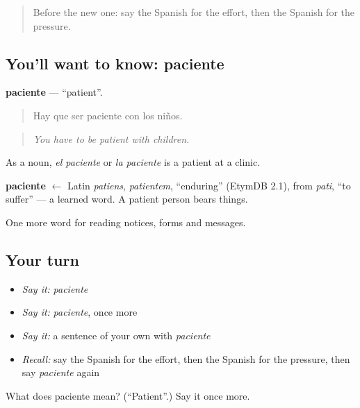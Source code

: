 \label{lesson:ES-C503-paciente}



\begin{quote}
Before the new one: say the Spanish for the effort, then the Spanish for the pressure.
\end{quote}

\subsection*{You'll want to know: paciente}
\textbf{paciente} — \textquotedblleft{}patient\textquotedblright{}.

\begin{quote}
Hay que ser paciente con los niños.
\end{quote}

\begin{quote}
\emph{You have to be patient with children.}
\end{quote}

As a noun, \emph{el paciente} or \emph{la paciente} is a patient at a clinic.

\begin{cousinweb}
\textbf{paciente} $\leftarrow$ Latin \emph{patiens}, \emph{patientem}, \textquotedblleft{}enduring\textquotedblright{} (EtymDB 2.1), from \emph{pati}, \textquotedblleft{}to suffer\textquotedblright{} — a learned word. A patient person bears things.
\end{cousinweb}

\begin{grammarlens}[title={What you've built}]
One more word for reading notices, forms and messages.
\end{grammarlens}

\subsection*{Your turn}
\begin{itemize}
\raggedright
  \item \emph{Say it:} \emph{paciente}
  \item \emph{Say it:} \emph{paciente}, once more
  \item \emph{Say it:} a sentence of your own with \emph{paciente}
  \item \emph{Recall:} say the Spanish for the effort, then the Spanish for the pressure, then say \emph{paciente} again
\end{itemize}

\begin{tcolorbox}[breakable,colback=teal!4,colframe=teal!35!black,title={Before you move on}]
What does paciente mean? (\textquotedblleft{}Patient\textquotedblright{}.) Say it once more.
\end{tcolorbox}
